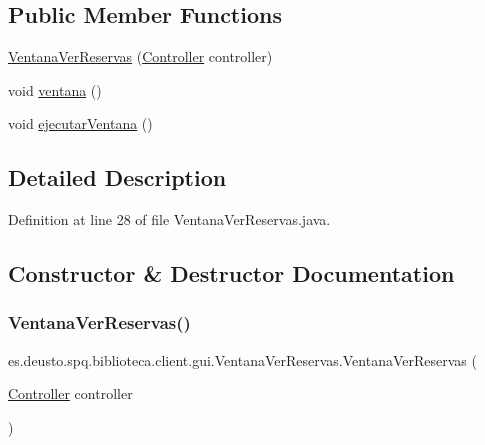 \subsection*{Public Member Functions}
\begin{DoxyCompactItemize}
\item 
\mbox{\hyperlink{classes_1_1deusto_1_1spq_1_1biblioteca_1_1client_1_1gui_1_1_ventana_ver_reservas_a930fb2d66105004c9f728e82ec63defb}{Ventana\+Ver\+Reservas}} (\mbox{\hyperlink{classes_1_1deusto_1_1spq_1_1biblioteca_1_1controller_1_1_controller}{Controller}} controller)
\item 
void \mbox{\hyperlink{classes_1_1deusto_1_1spq_1_1biblioteca_1_1client_1_1gui_1_1_ventana_ver_reservas_acb37e5558041a4fa7de51af1417a059f}{ventana}} ()
\item 
void \mbox{\hyperlink{classes_1_1deusto_1_1spq_1_1biblioteca_1_1client_1_1gui_1_1_ventana_ver_reservas_ac90346a9b9d28091f5504b4213e7f30b}{ejecutar\+Ventana}} ()
\end{DoxyCompactItemize}


\subsection{Detailed Description}


Definition at line 28 of file Ventana\+Ver\+Reservas.\+java.



\subsection{Constructor \& Destructor Documentation}
\mbox{\label{classes_1_1deusto_1_1spq_1_1biblioteca_1_1client_1_1gui_1_1_ventana_ver_reservas_a930fb2d66105004c9f728e82ec63defb}} 
\subsubsection{\texorpdfstring{Ventana\+Ver\+Reservas()}{VentanaVerReservas()}}
{\footnotesize\ttfamily es.\+deusto.\+spq.\+biblioteca.\+client.\+gui.\+Ventana\+Ver\+Reservas.\+Ventana\+Ver\+Reservas (\begin{DoxyParamCaption}\item[{\mbox{\hyperlink{classes_1_1deusto_1_1spq_1_1biblioteca_1_1controller_1_1_controller}{Controller}}}]{controller }\end{DoxyParamCaption})}

